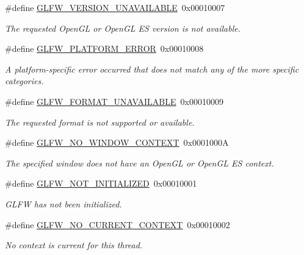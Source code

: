 \begin{DoxyCompactItemize}
\#define \hyperlink{group__errors_gad16c5565b4a69f9c2a9ac2c0dbc89462}{G\+L\+F\+W\+\_\+\+V\+E\+R\+S\+I\+O\+N\+\_\+\+U\+N\+A\+V\+A\+I\+L\+A\+B\+LE}~0x00010007
\begin{DoxyCompactList}\small\item\em The requested Open\+GL or Open\+GL ES version is not available. \end{DoxyCompactList}\item 
\#define \hyperlink{group__errors_gad44162d78100ea5e87cdd38426b8c7a1}{G\+L\+F\+W\+\_\+\+P\+L\+A\+T\+F\+O\+R\+M\+\_\+\+E\+R\+R\+OR}~0x00010008
\begin{DoxyCompactList}\small\item\em A platform-\/specific error occurred that does not match any of the more specific categories. \end{DoxyCompactList}\item 
\#define \hyperlink{group__errors_ga196e125ef261d94184e2b55c05762f14}{G\+L\+F\+W\+\_\+\+F\+O\+R\+M\+A\+T\+\_\+\+U\+N\+A\+V\+A\+I\+L\+A\+B\+LE}~0x00010009
\begin{DoxyCompactList}\small\item\em The requested format is not supported or available. \end{DoxyCompactList}\item 
\#define \hyperlink{group__errors_gacff24d2757da752ae4c80bf452356487}{G\+L\+F\+W\+\_\+\+N\+O\+\_\+\+W\+I\+N\+D\+O\+W\+\_\+\+C\+O\+N\+T\+E\+XT}~0x0001000A
\begin{DoxyCompactList}\small\item\em The specified window does not have an Open\+GL or Open\+GL ES context. \end{DoxyCompactList}\item 
\#define \hyperlink{group__errors_ga2374ee02c177f12e1fa76ff3ed15e14a}{G\+L\+F\+W\+\_\+\+N\+O\+T\+\_\+\+I\+N\+I\+T\+I\+A\+L\+I\+Z\+ED}~0x00010001
\begin{DoxyCompactList}\small\item\em G\+L\+FW has not been initialized. \end{DoxyCompactList}\item 
\#define \hyperlink{group__errors_gaa8290386e9528ccb9e42a3a4e16fc0d0}{G\+L\+F\+W\+\_\+\+N\+O\+\_\+\+C\+U\+R\+R\+E\+N\+T\+\_\+\+C\+O\+N\+T\+E\+XT}~0x00010002
\begin{DoxyCompactList}\small\item\em No context is current for this thread. \end{DoxyCompactList}\item 

\end{DoxyCompactItemize}
